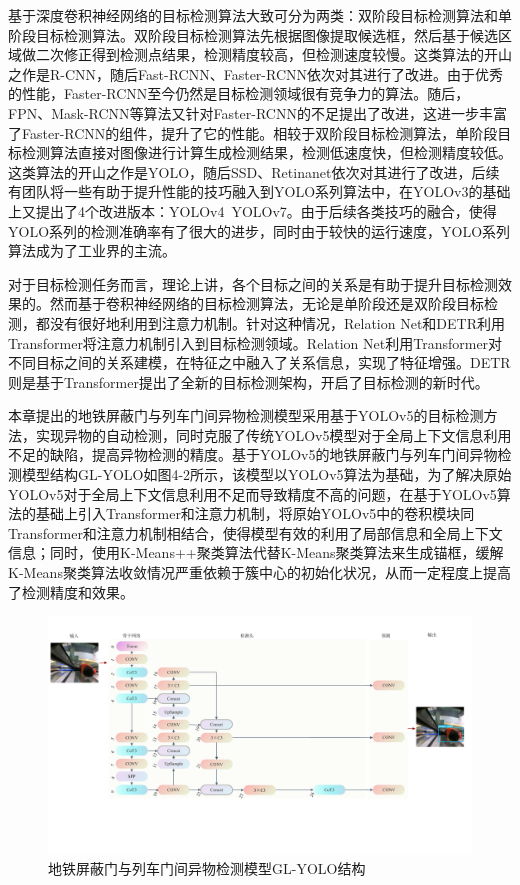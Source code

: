 基于深度卷积神经网络的目标检测算法大致可分为两类：双阶段目标检测算法和单阶段目标检测算法。双阶段目标检测算法先根据图像提取候选框，然后基于候选区域做二次修正得到检测点结果，检测精度较高，但检测速度较慢。这类算法的开山之作是R-CNN\cite{rcnn}，随后Fast-RCNN\cite{fastrcnn}、Faster-RCNN\cite{fasterrcnn}依次对其进行了改进。由于优秀的性能，Faster-RCNN至今仍然是目标检测领域很有竞争力的算法。随后，FPN\cite{FPN}、Mask-RCNN\cite{maskrcnn}等算法又针对Faster-RCNN的不足提出了改进，这进一步丰富了Faster-RCNN的组件，提升了它的性能。相较于双阶段目标检测算法，单阶段目标检测算法直接对图像进行计算生成检测结果，检测低速度快，但检测精度较低。这类算法的开山之作是YOLO\cite{yolov1,yolov2,yolov3}，随后SSD\cite{SSD}、Retinanet\cite{retinanet}依次对其进行了改进，后续有团队将一些有助于提升性能的技巧融入到YOLO系列算法中，在YOLOv3的基础上又提出了4个改进版本：YOLOv4~YOLOv7\cite{YOLOv4,glenn_jocher_2021_4679653,YOLOv6,yolov7}。由于后续各类技巧的融合，使得YOLO系列的检测准确率有了很大的进步，同时由于较快的运行速度，YOLO系列算法成为了工业界的主流。

对于目标检测任务而言，理论上讲，各个目标之间的关系是有助于提升目标检测效果的。然而基于卷积神经网络的目标检测算法，无论是单阶段还是双阶段目标检测，都没有很好地利用到注意力机制。针对这种情况，Relation Net\cite{Relationnet}和DETR\cite{detr}利用Transformer将注意力机制引入到目标检测领域。Relation Net利用Transformer对不同目标之间的关系建模，在特征之中融入了关系信息，实现了特征增强。DETR则是基于Transformer提出了全新的目标检测架构，开启了目标检测的新时代。

本章提出的地铁屏蔽门与列车门间异物检测模型采用基于YOLOv5的目标检测方法，实现异物的自动检测，同时克服了传统YOLOv5模型对于全局上下文信息利用不足的缺陷，提高异物检测的精度。基于YOLOv5的地铁屏蔽门与列车门间异物检测模型结构GL-YOLO如图4-2所示，该模型以YOLOv5算法为基础，为了解决原始YOLOv5对于全局上下文信息利用不足而导致精度不高的问题，在基于YOLOv5算法的基础上引入Transformer和注意力机制，将原始YOLOv5中的卷积模块同Transformer和注意力机制相结合，使得模型有效的利用了局部信息和全局上下文信息；同时，使用K-Means++聚类算法代替K-Means聚类算法来生成锚框，缓解K-Means聚类算法收敛情况严重依赖于簇中心的初始化状况，从而一定程度上提高了检测精度和效果。
\begin{figure}[htbp]
	\centering
	\includegraphics[scale=0.5]{Fig/GL-YOLO.pdf}
	\caption{\label{GL-YOLO}地铁屏蔽门与列车门间异物检测模型GL-YOLO结构}
\end{figure}

